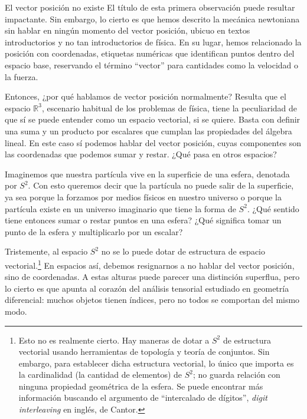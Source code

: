 \begin{observation}{El vector posición no existe}
    \label{obs.1-no_vector_posicion}
    El título de esta primera observación puede resultar impactante. Sin embargo, lo cierto es que hemos descrito la mecánica newtoniana sin hablar en ningún momento del vector posición, ubicuo en textos introductorios y no tan introductorios de física. En su lugar, hemos relacionado la posición con coordenadas, etiquetas numéricas que identifican puntos dentro del espacio base, reservando el término ``vector'' para cantidades como la velocidad o la fuerza. 
    
    Entonces, ¿por qué hablamos de vector posición normalmente? Resulta que el espacio \(\mathbb{R}^3\), escenario habitual de los problemas de física, tiene la peculiaridad de que sí se puede entender como un espacio vectorial, si se quiere. Basta con definir una suma y un producto por escalares que cumplan las propiedades del álgebra lineal. En este caso sí podemos hablar del vector posición, cuyas componentes son las coordenadas que podemos sumar y restar. ¿Qué pasa en otros espacios?
    
    Imaginemos que nuestra partícula vive en la superficie de una esfera, denotada por \(S^2\). Con esto queremos decir que la partícula no puede salir de la superficie, ya sea porque la forzamos por medios físicos en nuestro universo o porque la partícula existe en un universo imaginario que tiene la forma de \(S^2\). ¿Qué sentido tiene entonces sumar o restar puntos en una esfera? ¿Qué significa tomar un punto de la esfera y multiplicarlo por un escalar?
    

    Tristemente, al espacio \(S^2\) no se lo puede dotar de estructura de espacio vectorial.\footnote{Esto no es realmente cierto. Hay maneras de dotar a \(S^2\) de estructura vectorial usando herramientas de topología y teoría de conjuntos. Sin embargo, para establecer dicha estructura vectorial, lo único que importa es la cardinalidad (la cantidad de elementos) de \(S^2\); no guarda relación con ninguna propiedad geométrica de la esfera. Se puede encontrar más información buscando el argumento de ``intercalado de dígitos'', \textit{digit interleaving} en inglés, de Cantor.} En espacios así, debemos resignarnos a no hablar del vector posición, sino de coordenadas. A estas alturas puede parecer una distinción superflua, pero lo cierto es que apunta al corazón del análisis tensorial estudiado en geometría diferencial: muchos objetos tienen índices, pero no todos se comportan del mismo modo.
\end{observation}


